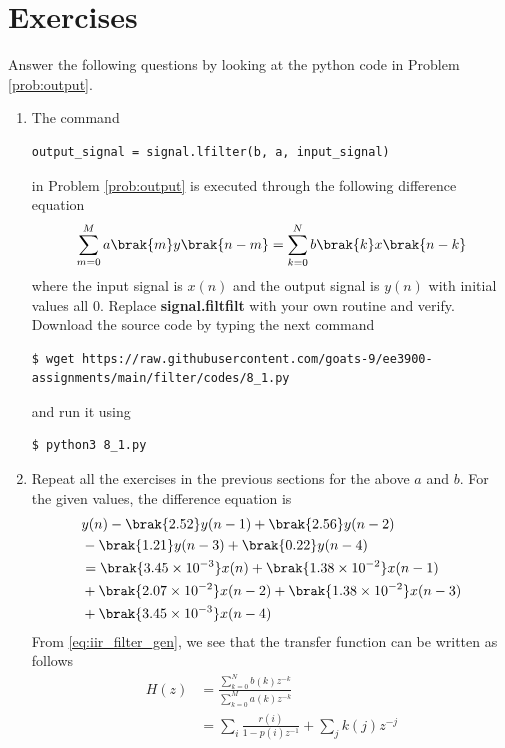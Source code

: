 \documentclass[journal,12pt,twocolumn]{IEEEtran}
\renewcommand\thesection{\arabic{section}}
\begin{document}
\section{Exercises}
\noindent Answer the following questions by looking at the python code in Problem \ref{prob:output}.
\begin{enumerate}[label=\thesection.\arabic*.,ref=\thesection.\theenumi]
\item
The command
\begin{lstlisting}
output_signal = signal.lfilter(b, a, input_signal)
\end{lstlisting}
in Problem \ref{prob:output} is executed through the following difference equation
\begin{equation}
\label{eq:iir_filter_gen}
 \sum _{m=0}^{M}a\brak{m}y\brak{n-m}=\sum _{k=0}^{N}b\brak{k}x\brak{n-k}
\end{equation}
where the input signal is $x(n)$ and the output signal is $y(n)$ with initial values all 0. Replace
\textbf{signal.filtfilt} with your own routine and verify.
\solution
Download the source code by typing the next command \\
\begin{lstlisting}
$ wget https://raw.githubusercontent.com/goats-9/ee3900-assignments/main/filter/codes/8_1.py
\end{lstlisting}
and run it using
\begin{lstlisting}
$ python3 8_1.py
\end{lstlisting}
\item Repeat all the exercises in the previous sections for the above $a$ and $b$.
\solution
For the given values, the difference equation is
\begin{align}
	&y(n) - \brak{2.52}y(n - 1) + \brak{2.56}y(n - 2) \nonumber \\
	&- \brak{1.21}y(n - 3) + \brak{0.22}y(n - 4) \nonumber \\
	&= \brak{3.45 \times 10^{-3}}x(n) + \brak{1.38 \times 10^{-2}}x(n - 1) \nonumber \\
	&+ \brak{2.07 \times 10^{-2}}x(n - 2) + \brak{1.38 \times 10^{-2}}x(n - 3) \nonumber \\
	&+ \brak{3.45 \times 10^{-3}}x(n - 4)
\end{align}
From \eqref{eq:iir_filter_gen}, we see that the transfer function can be written as follows
\begin{align}
	H(z) &= \frac{\sum_{k = 0}^{N}b(k)z^{-k}}{\sum_{k = 0}^{M}a(k)z^{-k}} \\
		 &= \sum_{i}\frac{r(i)}{1 - p(i)z^{-1}} + \sum_{j}k(j)z^{-j}

\end{align}
\end{enumerate}
\end{document}
